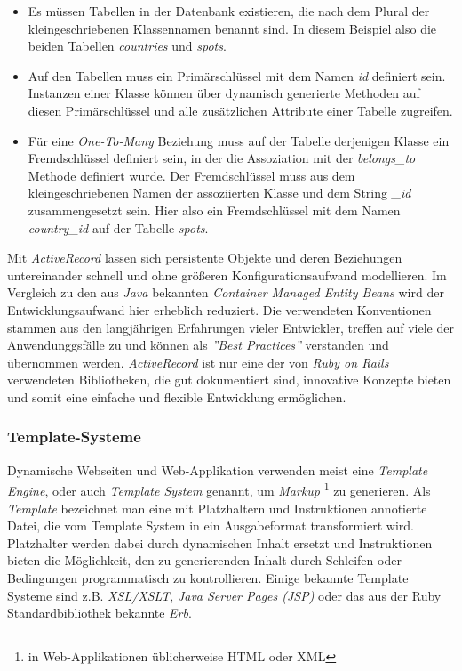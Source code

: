 \begin{itemize}
\item Es müssen Tabellen in der Datenbank existieren, die nach dem
  Plural der kleingeschriebenen Klassennamen benannt sind. In diesem
  Beispiel also die beiden Tabellen \textit{countries} und
  \textit{spots}.
\item Auf den Tabellen muss ein Primärschlüssel mit dem Namen
  \textit{id} definiert sein. Instanzen einer Klasse können über
  dynamisch generierte Methoden auf diesen Primärschlüssel und alle
  zusätzlichen Attribute einer Tabelle zugreifen.
\item Für eine \textit{One-To-Many} Beziehung muss auf der Tabelle
  derjenigen Klasse ein Fremdschlüssel definiert sein, in der die
  Assoziation mit der \textit{belongs\_to} Methode definiert
  wurde. Der Fremdschlüssel muss aus dem kleingeschriebenen Namen der
  assoziierten Klasse und dem String \textit{\_id} zusammengesetzt
  sein. Hier also ein Fremdschlüssel mit dem Namen
  \textit{country\_id} auf der Tabelle \textit{spots}.
\end{itemize}

Mit \textit{ActiveRecord} lassen sich persistente Objekte und deren
Beziehungen untereinander schnell und ohne größeren
Konfigurationsaufwand modellieren. Im Vergleich zu den aus
\textit{Java} bekannten \textit{Container Managed Entity Beans} wird
der Entwicklungsaufwand hier erheblich reduziert. Die verwendeten
Konventionen stammen aus den langjährigen Erfahrungen vieler
Entwickler, treffen auf viele der Anwendunggsfälle zu und können als
\textit{''Best Practices''} verstanden und über\-nommen
werden. \textit{ActiveRecord} ist nur eine der von \textit{Ruby on
  Rails} verwendeten Bibliotheken, die gut dokumentiert sind,
innovative Konzepte bieten und somit eine einfache und flexible
Entwicklung ermöglichen.

\subsubsection{Template-Systeme}

Dynamische Webseiten und Web-Applikation verwenden meist eine
\textit{Template Engine}, oder auch \textit{Template System} genannt,
um \textit{Markup} \footnote{in Web-Applikationen üblicherweise HTML oder XML}
zu generieren. Als \textit{Template} bezeichnet man eine mit
Platzhaltern und Instruktionen annotierte Datei, die vom Template
System in ein Ausgabeformat transformiert wird. Platzhalter werden
dabei durch dynamischen Inhalt ersetzt und Instruktionen bieten die
Möglichkeit, den zu generierenden Inhalt durch Schleifen oder
Bedingungen programmatisch zu kontrollieren. Einige bekannte Template
Systeme sind z.B. \textit{XSL/XSLT}, \textit{Java Server Pages (JSP)}
oder das aus der Ruby Standardbibliothek bekannte \textit{Erb}.

